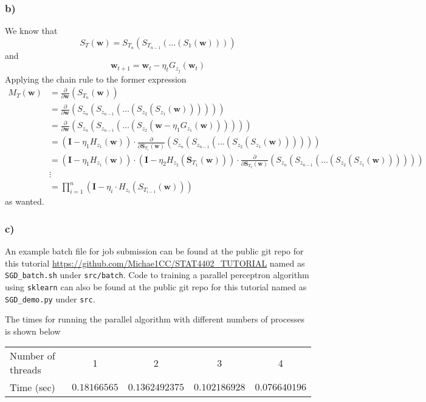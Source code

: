 \subsubsection*{{\bf b)}}
We know that
\[
    S_{T} \left( \bm{w} \right) = S_{T_{n}} \left( S_{T_{n-1}} \left( \ldots \left( S_{1} \left( \bm{w} \right) \right) \right) \right)
\]
and
\[
    \bm{w}_{t+1} = \bm{w}_{t} - \eta_{t} G_{z_{j}} \left( \bm{w}_{t} \right)
\]
Applying the chain rule to the former expression
\begingroup
\allowdisplaybreaks
\begin{align*}
    M_{T} \left( \bm{w} \right) &= \frac{\partial}{\partial \bm{w}} ( S_{T_{n}} \left( \bm{w} \right) ) \\
    &= \frac{\partial}{\partial \bm{w}} ( S_{z_{n}} ( S_{z_{n-1}} ( \ldots ( S_{z_{2}} (S_{z_{1}} ( \bm{w} )) ))  ) ) \\
    &= \frac{\partial}{\partial \bm{w}} ( S_{z_{n}} ( S_{z_{n-1}} ( \ldots ( S_{z_{2}} ( \bm{w} - \eta_{1} G_{z_{1}} \left( \bm{w} \right) ) ))  ) ) \\
    &= (\bm{I} - \eta_{1} H_{z_{1}} (\bm{w})) \cdot \frac{\partial}{\partial \bm{S}_{T_{1}} (\bm{w})} ( S_{z_{n}} ( S_{z_{n-1}} ( \ldots ( S_{z_{2}} (S_{z_{1}} ( \bm{w} )) ))  ) ) \\
    &= (\bm{I} - \eta_{1} H_{z_{1}} (\bm{w})) \cdot (\bm{I} - \eta_{2} H_{z_{2}} (\bm{S}_{T_{1}} ( \bm{w} ))) \cdot \frac{\partial}{\partial \bm{S}_{T_{2}} (\bm{w})} ( S_{z_{n}} ( S_{z_{n-1}} ( \ldots ( S_{z_{2}} (S_{z_{1}} ( \bm{w} )) ))  ) ) \\
    &\vdots \\
    &= \prod_{i=1}^{n} \left( \bm{I} - \eta_{i} \cdot H_{z_{i}} \left( S_{T_{i-1}} \left( \bm{w} \right) \right) \right)
\end{align*}
\endgroup
as wanted.

\subsubsection*{{\bf c)}}
An example batch file for job submission can be found at the public git repo for this tutorial \url{https://github.com/Michae1CC/STAT4402_TUTORIAL} named as \texttt{SGD\_batch.sh} under \texttt{src/batch}. Code to training a parallel perceptron algorithm using \texttt{sklearn} can also be found at the public git repo for this tutorial named as \texttt{SGD\_demo.py} under \texttt{src}.

The times for running the parallel algorithm with different numbers of processes is shown below
\begin{table}[h!!!]
\begin{tabular}{l|c|c|c|c}
Number of threads & 1 & 2 & 3 & 4 \\ \cline{2-5} 
Time (sec)        & $0.18166565$ & $0.1362492375$ & $0.102186928$ & $0.076640196$
\end{tabular}
\end{table}